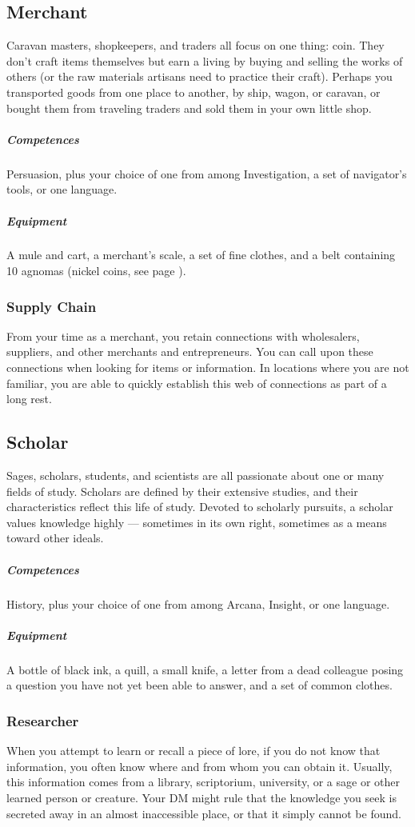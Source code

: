 \subsection*{Merchant} \label{ssec::merchant}
    Caravan masters, shopkeepers, and traders all focus on one thing: coin.
    They don't craft items themselves but earn a living by buying and selling the works of others (or the raw materials artisans need to practice their craft).
    Perhaps you transported goods from one place to another, by ship, wagon, or caravan, or bought them from traveling traders and sold them in your own little shop.
    \subparagraph{Competences} Persuasion, plus your choice of one from among Investigation, a set of navigator's tools, or one language.
    \subparagraph{Equipment} A mule and cart, a merchant's scale, a set of fine clothes, and a belt containing 10 agnomas (nickel coins, see page \pageref{sec::currency}).
    \subsubsection{Supply Chain} \label{feat::supplychain}
        From your time as a merchant, you retain connections with wholesalers, suppliers, and other merchants and entrepreneurs.
        You can call upon these connections when looking for items or information.
        In locations where you are not familiar, you are able to quickly establish this web of connections as part of a long rest.

\subsection*{Scholar} \label{ssec::scholar}
    Sages, scholars, students, and scientists are all passionate about one or many fields of study.
    Scholars are defined by their extensive studies, and their characteristics reflect this life of study.
    Devoted to scholarly pursuits, a scholar values knowledge highly --- sometimes in its own right, sometimes as a means toward other ideals.
    \subparagraph{Competences} History, plus your choice of one from among Arcana, Insight, or one language.
    \subparagraph{Equipment} A bottle of black ink, a quill, a small knife, a letter from a dead colleague posing a question you have not yet been able to answer, and a set of common clothes.
    \subsubsection{Researcher} \label{feat::researcher}
        When you attempt to learn or recall a piece of lore, if you do not know that information, you often know where and from whom you can obtain it.
        Usually, this information comes from a library, scriptorium, university, or a sage or other learned person or creature.
        Your DM might rule that the knowledge you seek is secreted away in an almost inaccessible place, or that it simply cannot be found.

